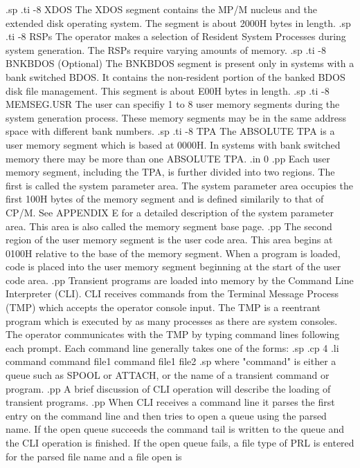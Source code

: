 .sp
.ti -8
XDOS          The XDOS segment contains the MP/M nucleus and
the extended disk operating system. The segment is about 2000H bytes
in length.
.sp
.ti -8
RSPs          The operator makes a selection of Resident System
Processes during system generation.  The RSPs require varying amounts
of memory.
.sp
.ti -8
BNKBDOS (Optional)  The BNKBDOS segment is present only in systems with
a bank switched BDOS.  It contains the non-resident portion of the
banked BDOS disk file management.  This segment is about E00H bytes in
length.
.sp
.ti -8
MEMSEG.USR    The user can specifiy 1 to 8 user memory segments during
the system generation process.  These memory segments may be in the
same address space with different bank numbers.
.sp
.ti -8
TPA           The ABSOLUTE TPA is a user memory segment which is based
at 0000H.  In systems with bank switched memory there may be more
than one ABSOLUTE TPA.
.in 0
.pp
Each user memory segment, including the TPA, is further divided
into two regions.  The first is called the system parameter area.
The system parameter area occupies the first 100H bytes of the
memory segment and is defined similarily to that of CP/M.
See APPENDIX E for
a detailed description of the system parameter area.  This area is
also called the memory segment base page.
.pp
The second region of the user memory segment is the user code area.
This area begins at 0100H relative to the base of the memory segment.
When a program is loaded, code is placed into the user memory segment
beginning at the start of the user code area.
.pp
Transient programs are loaded into memory by the Command Line
Interpreter (CLI).  CLI receives commands from the Terminal Message
Process (TMP) which accepts the operator console input.
The TMP is a reentrant program which is executed by as many processes
as there are system consoles.
The operator communicates with the TMP by typing command lines
following each prompt.  Each command line generally takes one of the
forms:
.sp
.cp 4
.li
                          command
                          command file1
                          command file1 file2
.sp
where "command" is either a queue such as SPOOL or ATTACH,
or the name of a transient command or program.
.pp
A brief discussion of CLI operation will describe the loading of
transient programs.
.pp
When CLI receives a command line it parses the first entry on the
command line and then tries to open a queue using the parsed name.
If the open queue succeeds the command tail is written to the queue
and the CLI operation is finished.  If the open queue fails, a file
type of PRL is entered for the parsed file name and a file open is
